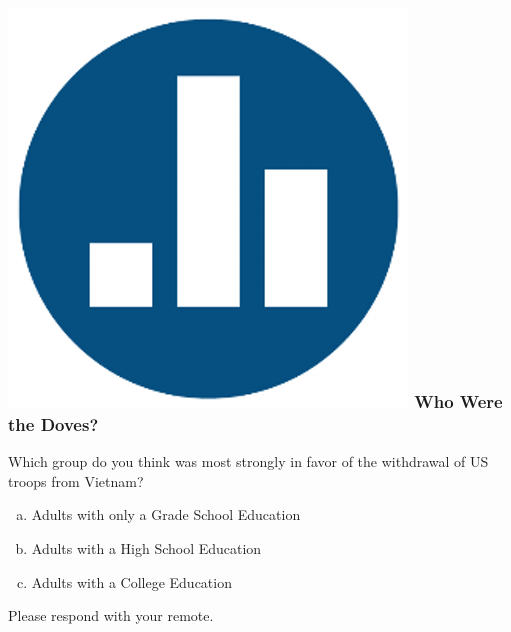 \begin{frame}
\frametitle{\includegraphics[scale = 0.05]{./images/clicker} \hfill Who Were the Doves?}
Which group do you think was most strongly \alert{in favor of} the withdrawal of US troops from Vietnam?
\begin{enumerate}[(a)]
	\item Adults with only a Grade School Education
	\item Adults with a High School Education
	\item Adults with a College Education
\end{enumerate}
\vspace{2em}
Please respond with your remote.

\end{frame}

